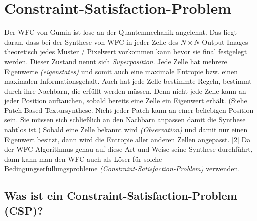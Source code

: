 \documentclass[12pt, a4paper,twoside,openright]{report}
\begin{document}
\section{Constraint-Satisfaction-Problem}

Der WFC von Gumin ist lose an der Quantenmechanik angelehnt.
Das liegt daran, dass bei der Synthese von WFC in jeder Zelle des $N\times N$ Output-Images theoretisch jedes Muster / Pixelwert vorkommen kann bevor sie final festgelegt werden.
Dieser Zustand nennt sich \textit{Superposition}.
Jede Zelle hat mehrere Eigenwerte \textit{(eigenstates)} und somit auch eine maximale Entropie bzw. einen maximalen Informationsgehalt.
Auch hat jede Zelle bestimmte Regeln, bestimmt durch ihre Nachbarn, die erfüllt werden müssen.
Denn nicht jede Zelle kann an jeder Position auftauchen, sobald bereits eine Zelle ein Eigenwert erhält.
{(Siehe Patch-Based Textursynthese. Nicht jeder Patch kann an einer beliebigen Position sein.
Sie müssen sich schließlich an den Nachbarn anpassen damit die Synthese nahtlos ist.)}
Sobald eine Zelle bekannt wird \textit{(Observation)} und damit nur einen Eigenwert besitzt,
dann wird die Entropie aller anderen Zellen angepasst. {[2]}
Da der WFC Algorithmus genau auf diese Art und Weise seine Synthese durchführt,
dann kann man den WFC auch als Löser für solche Bedingungserfüllungsprobleme \textit{(Constraint-Satisfaction-Problem)} verwenden.

\subsection{Was ist ein Constraint-Satisfaction-Problem {(CSP)}?}
\end{document}
